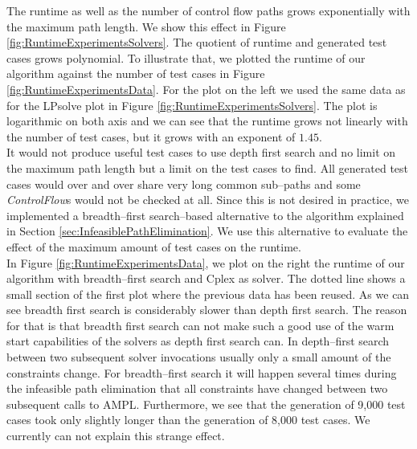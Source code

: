\documentclass[runningheads,a4paper]{llncs}%
\newcommand{\UMLType}[1]{\textsf{\textit{#1}}} %
\begin{document}
The runtime as well as the number of control flow paths grows exponentially with the maximum path length. We show this effect in Figure \ref{fig:RuntimeExperimentsSolvers}. The quotient of runtime and generated test cases grows polynomial. 
To illustrate that, we plotted the runtime of our algorithm against the number of test cases in Figure \ref{fig:RuntimeExperimentsData}. For the plot on the left we used the same data as for the LPsolve plot in Figure \ref{fig:RuntimeExperimentsSolvers}. The plot is logarithmic on both axis and we can see that the runtime grows not linearly with the number of test cases, but it grows with an exponent of $1.45$.\\
It would not produce useful test cases to use depth first search and no limit on the maximum path length but a limit on the test cases to find. All generated test cases would over and over share very long common sub--paths and some \UMLType{ControlFlow}s would not be checked at all. Since this is not desired in practice, we implemented a breadth--first search--based alternative to the algorithm explained in Section \ref{sec:InfeasiblePathElimination}. We use this alternative to evaluate the effect of the maximum amount of test cases on the runtime.\\
In Figure \ref{fig:RuntimeExperimentsData}, we plot on the right the runtime of our algorithm with breadth--first search and Cplex as solver. The dotted line shows a small section of the first plot where the previous data has been reused. As we can see breadth first search is considerably slower than depth first search. The reason for that is that breadth first search can not make such a good use of the warm start capabilities of the solvers as depth first search can. In depth--first search between two subsequent solver invocations usually only a small amount of the constraints change. For breadth--first search it will happen several times during the infeasible path elimination that all constraints have changed between two subsequent calls to AMPL. Furthermore, we see that the generation of 9,000 test cases took only slightly longer than the generation of 8,000 test cases. We currently can not explain this strange effect.
\end{document}
